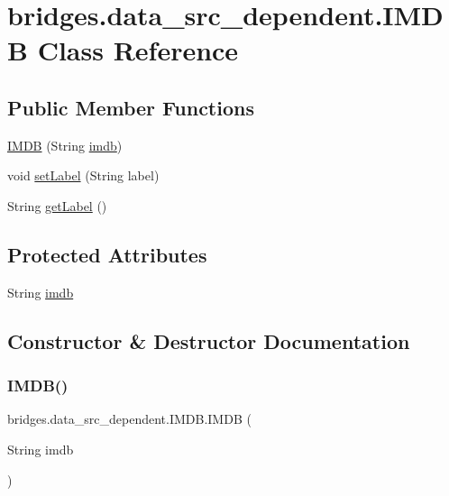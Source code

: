 \hypertarget{classbridges_1_1data__src__dependent_1_1_i_m_d_b}{}\section{bridges.\+data\+\_\+src\+\_\+dependent.\+I\+M\+DB Class Reference}
\label{classbridges_1_1data__src__dependent_1_1_i_m_d_b}
\subsection*{Public Member Functions}
\begin{DoxyCompactItemize}
\item 
\mbox{\hyperlink{classbridges_1_1data__src__dependent_1_1_i_m_d_b_aff9987e893b16275182bc81b7e64b048}{I\+M\+DB}} (String \mbox{\hyperlink{classbridges_1_1data__src__dependent_1_1_i_m_d_b_a2913407abe6019a396d4a2ac086283df}{imdb}})
\item 
void \mbox{\hyperlink{classbridges_1_1data__src__dependent_1_1_i_m_d_b_a9022297c43873b9df0ad6d3c91977bd8}{set\+Label}} (String label)
\item 
String \mbox{\hyperlink{classbridges_1_1data__src__dependent_1_1_i_m_d_b_ad2d0e1edabdb0596a3308c160f63cb2b}{get\+Label}} ()
\end{DoxyCompactItemize}
\subsection*{Protected Attributes}
\begin{DoxyCompactItemize}
\item 
String \mbox{\hyperlink{classbridges_1_1data__src__dependent_1_1_i_m_d_b_a2913407abe6019a396d4a2ac086283df}{imdb}}
\end{DoxyCompactItemize}


\subsection{Constructor \& Destructor Documentation}
\mbox{\label{classbridges_1_1data__src__dependent_1_1_i_m_d_b_aff9987e893b16275182bc81b7e64b048}} 
\subsubsection{\texorpdfstring{IMDB()}{IMDB()}}
{\footnotesize\ttfamily bridges.\+data\+\_\+src\+\_\+dependent.\+I\+M\+D\+B.\+I\+M\+DB (\begin{DoxyParamCaption}\item[{String}]{imdb }\end{DoxyParamCaption})}



